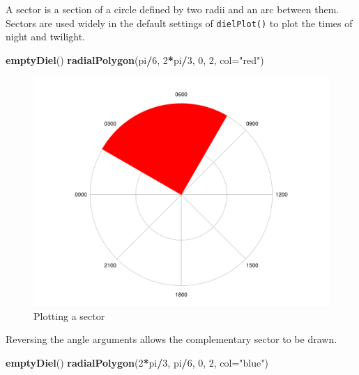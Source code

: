 \documentclass[
]{book}
\newenvironment{Shaded}{\begin{snugshade}}{\end{snugshade}}
\newcommand{\AttributeTok}[1]{\textcolor[rgb]{0.13,0.29,0.53}{#1}}
\newcommand{\DecValTok}[1]{\textcolor[rgb]{0.00,0.00,0.81}{#1}}
\newcommand{\FunctionTok}[1]{\textcolor[rgb]{0.13,0.29,0.53}{\textbf{#1}}}
\newcommand{\NormalTok}[1]{#1}
\newcommand{\SpecialCharTok}[1]{\textcolor[rgb]{0.81,0.36,0.00}{\textbf{#1}}}
\newcommand{\StringTok}[1]{\textcolor[rgb]{0.31,0.60,0.02}{#1}}
\begin{document}
A sector is a section of a circle defined by two radii and an arc between them. Sectors are used widely in the default settings of \texttt{dielPlot()} to plot the times of night and twilight.

\begin{Shaded}
\begin{Highlighting}[]
\FunctionTok{emptyDiel}\NormalTok{()}
\FunctionTok{radialPolygon}\NormalTok{(pi}\SpecialCharTok{/}\DecValTok{6}\NormalTok{, }\DecValTok{2}\SpecialCharTok{*}\NormalTok{pi}\SpecialCharTok{/}\DecValTok{3}\NormalTok{, }\DecValTok{0}\NormalTok{, }\DecValTok{2}\NormalTok{, }\AttributeTok{col=}\StringTok{"red"}\NormalTok{)}
\end{Highlighting}
\end{Shaded}

\begin{figure}

{\centering \includegraphics[width=0.9\linewidth]{_main_files/figure-latex/radialPolygon-sector-1} 

}

\caption{Plotting a sector}\label{fig:radialPolygon-sector}
\end{figure}

Reversing the angle arguments allows the complementary sector to be drawn.

\begin{Shaded}
\begin{Highlighting}[]
\FunctionTok{emptyDiel}\NormalTok{()}
\FunctionTok{radialPolygon}\NormalTok{(}\DecValTok{2}\SpecialCharTok{*}\NormalTok{pi}\SpecialCharTok{/}\DecValTok{3}\NormalTok{, pi}\SpecialCharTok{/}\DecValTok{6}\NormalTok{, }\DecValTok{0}\NormalTok{, }\DecValTok{2}\NormalTok{, }\AttributeTok{col=}\StringTok{"blue"}\NormalTok{)}
\end{Highlighting}
\end{Shaded}
\end{document}
